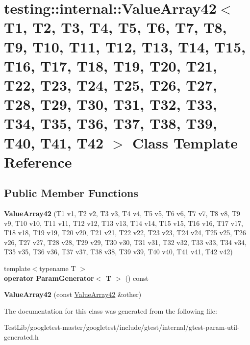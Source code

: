 \hypertarget{classtesting_1_1internal_1_1ValueArray42}{}\section{testing\+:\+:internal\+:\+:Value\+Array42$<$ T1, T2, T3, T4, T5, T6, T7, T8, T9, T10, T11, T12, T13, T14, T15, T16, T17, T18, T19, T20, T21, T22, T23, T24, T25, T26, T27, T28, T29, T30, T31, T32, T33, T34, T35, T36, T37, T38, T39, T40, T41, T42 $>$ Class Template Reference}
\label{classtesting_1_1internal_1_1ValueArray42}
\subsection*{Public Member Functions}
\begin{DoxyCompactItemize}
\item 
\mbox{\label{classtesting_1_1internal_1_1ValueArray42_a808166b8385b5a4f720ac02a06b116bd}} 
{\bfseries Value\+Array42} (T1 v1, T2 v2, T3 v3, T4 v4, T5 v5, T6 v6, T7 v7, T8 v8, T9 v9, T10 v10, T11 v11, T12 v12, T13 v13, T14 v14, T15 v15, T16 v16, T17 v17, T18 v18, T19 v19, T20 v20, T21 v21, T22 v22, T23 v23, T24 v24, T25 v25, T26 v26, T27 v27, T28 v28, T29 v29, T30 v30, T31 v31, T32 v32, T33 v33, T34 v34, T35 v35, T36 v36, T37 v37, T38 v38, T39 v39, T40 v40, T41 v41, T42 v42)
\item 
\mbox{\label{classtesting_1_1internal_1_1ValueArray42_a498cac534f735c93347f4373e6a5c709}} 
{\footnotesize template$<$typename T $>$ }\\{\bfseries operator Param\+Generator$<$ T $>$} () const
\item 
\mbox{\label{classtesting_1_1internal_1_1ValueArray42_a12ce75361d1e6810be50f7bf83b04b01}} 
{\bfseries Value\+Array42} (const \hyperlink{classtesting_1_1internal_1_1ValueArray42}{Value\+Array42} \&other)
\end{DoxyCompactItemize}


The documentation for this class was generated from the following file\+:\begin{DoxyCompactItemize}
\item 
Test\+Lib/googletest-\/master/googletest/include/gtest/internal/gtest-\/param-\/util-\/generated.\+h\end{DoxyCompactItemize}
